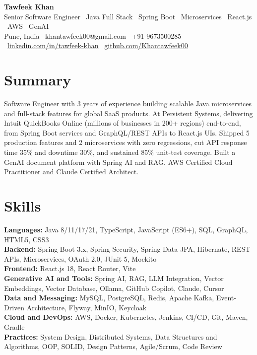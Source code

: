 \documentclass[10pt, letterpaper]{article}
\begin{document}
\begin{center}
    {\huge \textbf{Tawfeek Khan}} \\[2pt]
    {\normalsize Senior Software Engineer \textbar\ Java Full Stack \textbar\ Spring Boot \textbar\ Microservices \textbar\ React.js \textbar\ AWS \textbar\ GenAI} \\[1pt]
    \small
    Pune, India \textbar\
    khantawfeek00@gmail.com \textbar\
    +91-9673500285 \textbar\
    \href{https://www.linkedin.com/in/tawfeek-khan/}{linkedin.com/in/tawfeek-khan} \textbar\
    \href{https://github.com/Khantawfeek00}{github.com/Khantawfeek00}
\end{center}

\section{Summary}
Software Engineer with 3 years of experience building scalable Java microservices and full-stack features for global SaaS products. At Persistent Systems, delivering Intuit QuickBooks Online (millions of businesses in 200+ regions) end-to-end, from Spring Boot services and GraphQL/REST APIs to React.js UIs. Shipped 5 production features and 2 microservices with zero regressions, cut API response time 35\% and downtime 30\%, and sustained 85\% unit-test coverage. Built a GenAI document platform with Spring AI and RAG. AWS Certified Cloud Practitioner and Claude Certified Architect.

\section{Skills}
\textbf{Languages:} Java 8/11/17/21, TypeScript, JavaScript (ES6+), SQL, GraphQL, HTML5, CSS3 \\
\textbf{Backend:} Spring Boot 3.x, Spring Security, Spring Data JPA, Hibernate, REST APIs, Microservices, OAuth 2.0, JUnit 5, Mockito \\
\textbf{Frontend:} React.js 18, React Router, Vite \\
\textbf{Generative AI and Tools:} Spring AI, RAG, LLM Integration, Vector Embeddings, Vector Database, Ollama, GitHub Copilot, Claude, Cursor \\
\textbf{Data and Messaging:} MySQL, PostgreSQL, Redis, Apache Kafka, Event-Driven Architecture, Flyway, MinIO, Keycloak \\
\textbf{Cloud and DevOps:} AWS, Docker, Kubernetes, Jenkins, CI/CD, Git, Maven, Gradle \\
\textbf{Practices:} System Design, Distributed Systems, Data Structures and Algorithms, OOP, SOLID, Design Patterns, Agile/Scrum, Code Review
\end{document}
